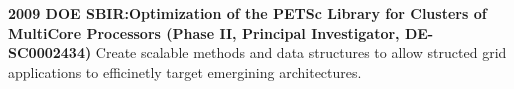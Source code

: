 \begin{itemize}
 	
 	\textbf{2009 DOE SBIR:Optimization of the PETSc Library for
 		Clusters of MultiCore Processors (Phase II, Principal
 		Investigator, DE-SC0002434)}
 	Create scalable methods and data
 	structures to allow structed grid applications to efficinetly
 	target emergining architectures.  
 	
 	
 	
 	
 	
 	

\end{itemize}
